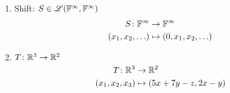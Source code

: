 {\begin{enumerate}[label=(\roman*)]
		      \begin{enumerate}
			      \item \(I(p(x) +_{P(\RR)} q(x)) = \int_{0}^{1} (p(x) + q(x)) dx = \int_{0}^{1} p(x) dx + \int_{0}^{1} q(x) dx = I(p(x)) +_{\RR} I(q(x))\)
			      \item \(I(\lambda \cdot_{P(\RR)} p(x)) = \int_{0}^{1} (\lambda p(x)) dx = \lambda \int_{0}^{1} p(x) dx = \lambda I(p(x))\)
		      \end{enumerate}
		\item Shift: \(S \in \sL(\FF^{\infty}, \FF^{\infty})\)
		      \begin{align*}
			      S \colon \FF^{\infty}  & \to \FF^{\infty}                  \\
			      (x_{1}, x_{2}, \ldots) & \mapsto (0, x_{1}, x_{2}, \ldots)
		      \end{align*}
		\item \(T \colon \RR^{3} \to \RR^{2}\)
		      \begin{align*}
			      T \colon \RR^{3}      & \to \RR^{2}                  \\
			      (x_{1}, x_{2}, x_{3}) & \mapsto (5x + 7y - z, 2x -y)
		      \end{align*}
	\end{enumerate}
}

